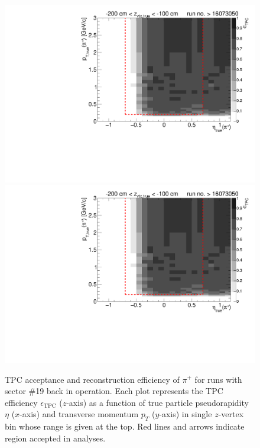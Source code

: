 \begin{figure}[hb]
	\caption[TPC acceptance and reconstruction efficiency of $\pi^{+}$ for runs with  sector \#19 back in operation.]{TPC acceptance and reconstruction efficiency of $\pi^{+}$ for runs with  sector \#19 back in operation. Each plot represents the TPC efficiency $\epsilon_{\text{TPC}}$ ($z$-axis) as a function of true particle pseudorapidity $\eta$ ($x$-axis) and transverse momentum $p_{T}$ ($y$-axis) in single $z$-vertex bin whose range is given at the top. Red lines and arrows indicate region accepted in analyses.}\label{fig:tpcEff_pion_plus1}
	\centering
	\parbox{0.495\textwidth}{
		\centering
		\includegraphics[width=\linewidth,page=3]{graphics/eff/Eff2D_TPC_pion_Plus_RunRange2.pdf}\\
		\includegraphics[width=\linewidth,page=5]{graphics/eff/Eff2D_TPC_pion_Plus_RunRange2.pdf}\\
}
\end{figure}
